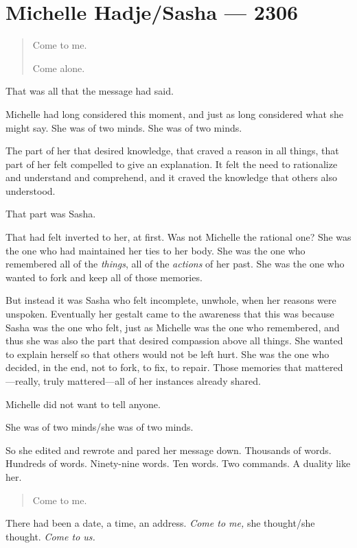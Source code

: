 \hypertarget{michelle-hadjesasha-2306}{%
\chapter{Michelle Hadje/Sasha — 2306}\label{michelle-hadjesasha-2306}}

\begin{quote}
Come to me.

Come alone.
\end{quote}

That was all that the message had said.

Michelle had long considered this moment, and just as long considered what she might say. She was of two minds. She was of two minds.

The part of her that desired knowledge, that craved a reason in all things, that part of her felt compelled to give an explanation. It felt the need to rationalize and understand and comprehend, and it craved the knowledge that others also understood.

That part was Sasha.

That had felt inverted to her, at first. Was not Michelle the rational one? She was the one who had maintained her ties to her body. She was the one who remembered all of the \emph{things}, all of the \emph{actions} of her past. She was the one who wanted to fork and keep all of those memories.

But instead it was Sasha who felt incomplete, unwhole, when her reasons were unspoken. Eventually her gestalt came to the awareness that this was because Sasha was the one who felt, just as Michelle was the one who remembered, and thus she was also the part that desired compassion above all things. She wanted to explain herself so that others would not be left hurt. She was the one who decided, in the end, not to fork, to fix, to repair. Those memories that mattered---really, truly mattered---all of her instances already shared.

Michelle did not want to tell anyone.

She was of two minds/she was of two minds.

So she edited and rewrote and pared her message down. Thousands of words. Hundreds of words. Ninety-nine words. Ten words. Two commands. A duality like her.

\begin{quote}
Come to me.
\end{quote}

There had been a date, a time, an address. \emph{Come to me,} she thought/she thought. \emph{Come to us.}


